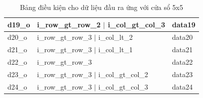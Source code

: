 \begin{table}[H]
\begin{tabular}{|p{2.2cm} p{7cm} p{4cm}|}
      d19\_o & i\_row\_gt\_row\_2 $\vert$ i\_col\_gt\_col\_3 & data19 \\ \hline
      d20\_o & i\_row\_gt\_row\_3 $\vert$ i\_col\_lt\_2     & data20 \\ \hline
      d21\_o & i\_row\_gt\_row\_3 $\vert$ i\_col\_lt\_1     & data21 \\ \hline
      d22\_o & i\_row\_gt\_row\_3                           & data22 \\ \hline
      d23\_o & i\_row\_gt\_row\_3 $\vert$ i\_col\_gt\_col\_2 & data23 \\ \hline
      d24\_o & i\_row\_gt\_row\_3 $\vert$ i\_col\_gt\_col\_3 & data24 \\ \hline
    \end{tabular}
    \caption{Bảng điều kiện cho dữ liệu đầu ra ứng với cửa sổ 5x5}
    \label{tab:conditionForOutputZero5x5}
\end{table}

